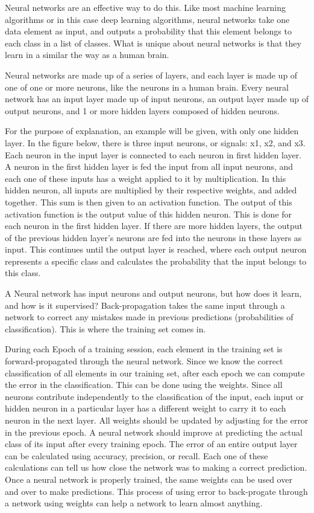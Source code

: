 \documentclass[12pt]{article} %
\begin{document}
Neural networks are an effective way to do this. Like most machine learning algorithms or in this case deep learning algorithms, neural networks take one data element as input, and outputs a probability that this element belongs to each class in a list of classes. What is unique about neural networks is that they learn in a similar the way as a human brain. 

Neural networks are made up of a series of layers, and each layer is made up of one of one or more neurons, like the neurons in a human brain. Every neural network has an input layer made up of input neurons, an output layer made up of output neurons, and 1 or more hidden layers composed of hidden neurons. 

For the purpose of explanation, an example will be given, with only one hidden layer. In the figure below, there is three input neurons, or signals: x1, x2, and x3. Each neuron in the input layer is connected to each neuron in first hidden layer. A neuron in the first hidden layer is fed the input from all input neurons, and each one of these inputs has a weight applied to it by multiplication. In this hidden neuron, all inputs are multiplied by their respective weights, and added together. This sum is then given to an activation function. The output of this activation function is the output value of this hidden neuron. This is done for each neuron in the first hidden layer. If there are more hidden layers, the output of the previous hidden layer's neurons are fed into the neurons in these layers as input. This continues until the output layer is reached, where each output neuron represents a specific class and calculates the probability that the input belongs to this class.\cite{KubatMachineLearn}
	
 	A Neural network has input neurons and output neurons, but how does it learn, and how is it supervised? Back-propagation takes the same input through a network to correct any mistakes made in previous predictions (probabilities of classification). This is where the training set comes in. 

During each Epoch of a training session, each element in the training set is forward-propagated through the neural network. Since we know the correct classification of all elements in our training set, after each epoch we can compute the error in the classification. This can be done using the weights. Since all neurons contribute independently to the classification of the input, each input or hidden neuron in a particular layer has a different weight to carry it to each neuron in the next layer. All weights should be updated by adjusting for the error in the previous epoch. A neural network should improve at predicting the actual class of its input after every training epoch. The error of an entire output layer can be calculated using accuracy, precision, or recall. Each one of these calculations can tell us how close the network was to making a correct prediction. Once a neural network is properly trained, the same weights can be used over and over to make predictions. This process of using error to back-progate through a network using weights can help a network to learn almost anything.\cite{KubatMachineLearn} 
	
\end{document}
